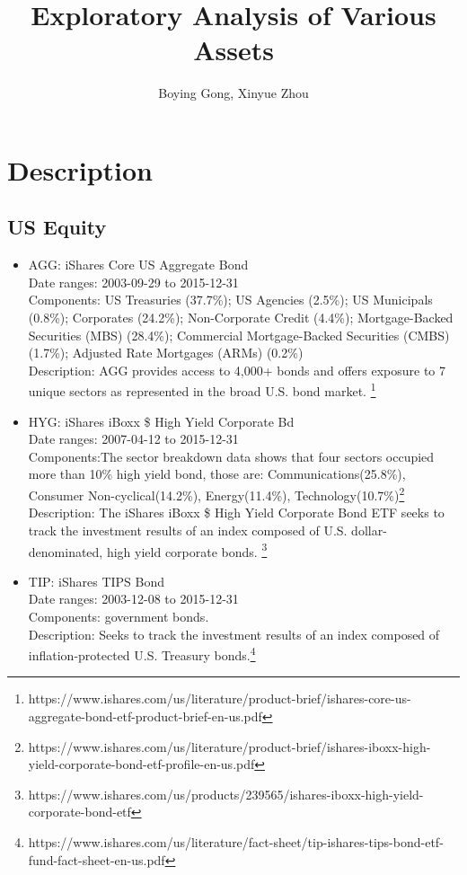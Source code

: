 \documentclass[12pt]{article}
\title{Exploratory Analysis of Various Assets}
\author{Boying Gong, Xinyue Zhou}
\begin{document}
\maketitle

\section{Description}
\subsection{US Equity}

\begin{itemize}
\item AGG: iShares Core US Aggregate Bond\\
Date ranges: 2003-09-29 to 2015-12-31\\
Components: US Treasuries (37.7\%);
US Agencies (2.5\%); US Municipals (0.8\%);
Corporates (24.2\%); Non-Corporate Credit (4.4\%); Mortgage-Backed Securities (MBS) (28.4\%); Commercial Mortgage-Backed Securities (CMBS) (1.7\%); Adjusted Rate Mortgages (ARMs) (0.2\%)
\\
Description: AGG provides access to 4,000+ bonds and offers exposure to 7 unique sectors as represented in the broad U.S. bond market. \footnote{https://www.ishares.com/us/literature/product-brief/ishares-core-us-aggregate-bond-etf-product-brief-en-us.pdf}
\item HYG: iShares iBoxx \$ High Yield Corporate Bd\\
Date ranges: 2007-04-12 to 2015-12-31\\
Components:The sector breakdown data  shows that four sectors occupied more than 10\% high yield bond, those are: Communications(25.8\%), Consumer Non-cyclical(14.2\%), Energy(11.4\%), Technology(10.7\%)\footnote{https://www.ishares.com/us/literature/product-brief/ishares-iboxx-high-yield-corporate-bond-etf-profile-en-us.pdf}\\
Description: The iShares iBoxx \$ High Yield Corporate Bond ETF seeks to track the investment results of an index composed of U.S. dollar-denominated, high yield corporate bonds. \footnote{https://www.ishares.com/us/products/239565/ishares-iboxx-high-yield-corporate-bond-etf}

\item TIP: iShares TIPS Bond\\
Date ranges: 2003-12-08 to 2015-12-31\\
Components: government bonds. \\
Description: Seeks to track the investment results of an index composed of inflation-protected U.S. Treasury bonds.\footnote{https://www.ishares.com/us/literature/fact-sheet/tip-ishares-tips-bond-etf-fund-fact-sheet-en-us.pdf}
\end{itemize}
\end{document}
